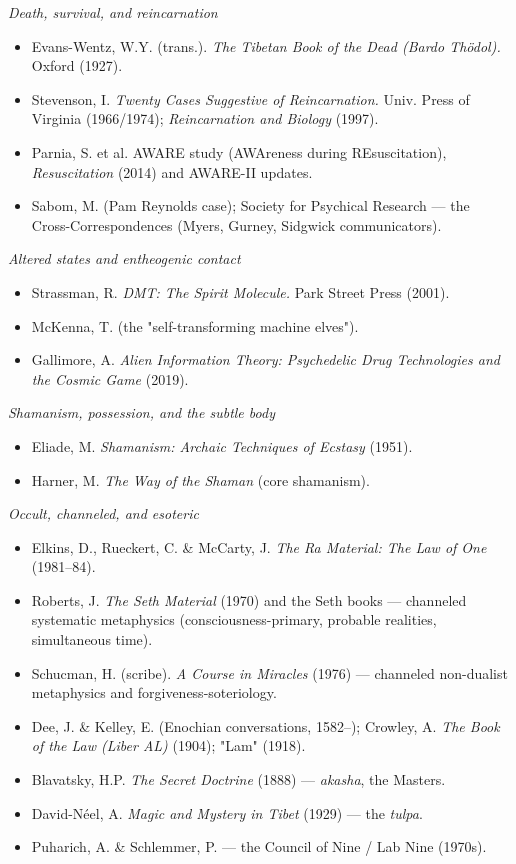 \documentclass[11pt]{article}
\begin{document}
\emph{Death, survival, and reincarnation}

\begin{itemize}
\item Evans-Wentz, W.Y. (trans.). \emph{The Tibetan Book of the Dead (Bardo Thödol).} Oxford (1927).
\item Stevenson, I. \emph{Twenty Cases Suggestive of Reincarnation.} Univ. Press of Virginia (1966/1974); \emph{Reincarnation and Biology} (1997).
\item Parnia, S. et al. AWARE study (AWAreness during REsuscitation), \emph{Resuscitation} (2014) and AWARE-II updates.
\item Sabom, M. (Pam Reynolds case); Society for Psychical Research --- the Cross-Correspondences (Myers, Gurney, Sidgwick communicators).
\end{itemize}

\emph{Altered states and entheogenic contact}

\begin{itemize}
\item Strassman, R. \emph{DMT: The Spirit Molecule.} Park Street Press (2001).
\item McKenna, T. (the "self-transforming machine elves").
\item Gallimore, A. \emph{Alien Information Theory: Psychedelic Drug Technologies and the Cosmic Game} (2019).
\end{itemize}

\emph{Shamanism, possession, and the subtle body}

\begin{itemize}
\item Eliade, M. \emph{Shamanism: Archaic Techniques of Ecstasy} (1951).
\item Harner, M. \emph{The Way of the Shaman} (core shamanism).
\end{itemize}

\emph{Occult, channeled, and esoteric}

\begin{itemize}
\item Elkins, D., Rueckert, C. \& McCarty, J. \emph{The Ra Material: The Law of One} (1981--84).
\item Roberts, J. \emph{The Seth Material} (1970) and the Seth books --- channeled systematic metaphysics (consciousness-primary, probable realities, simultaneous time).
\item Schucman, H. (scribe). \emph{A Course in Miracles} (1976) --- channeled non-dualist metaphysics and forgiveness-soteriology.
\item Dee, J. \& Kelley, E. (Enochian conversations, 1582--); Crowley, A. \emph{The Book of the Law (Liber AL)} (1904); "Lam" (1918).
\item Blavatsky, H.P. \emph{The Secret Doctrine} (1888) --- \emph{akasha}, the Masters.
\item David-Néel, A. \emph{Magic and Mystery in Tibet} (1929) --- the \emph{tulpa}.
\item Puharich, A. \& Schlemmer, P. --- the Council of Nine / Lab Nine (1970s).
\end{itemize}
\end{document}
